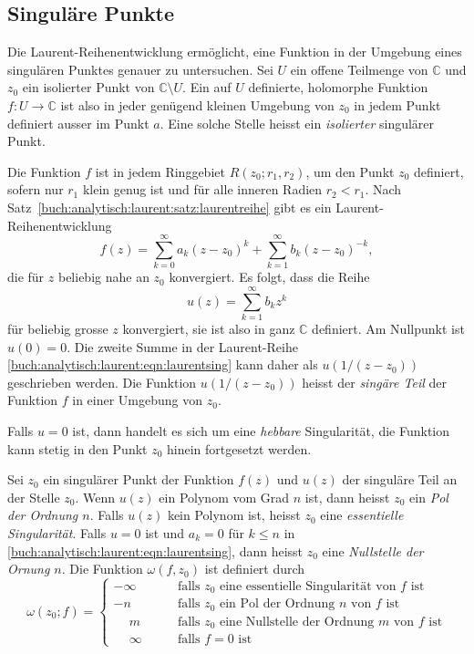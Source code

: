 %
%
%
\subsection{Singuläre Punkte}
Die Laurent-Reihenentwicklung ermöglicht, eine Funktion in der Umgebung
eines singulären Punktes genauer zu untersuchen.
Sei $U$ ein offene Teilmenge von $\mathbb{C}$ und $z_0$ ein isolierter
Punkt von $\mathbb{C}\setminus U$.
Ein auf $U$ definierte, holomorphe Funktion $f\colon U\to\mathbb{C}$
ist also in jeder genügend kleinen Umgebung von $z_0$ in jedem Punkt
definiert ausser im Punkt $a$.
Eine solche Stelle heisst ein \emph{isolierter} singulärer Punkt.
%
%

Die Funktion $f$ ist in jedem Ringgebiet $R(z_0;r_1,r_2)$, um den Punkt
$z_0$ definiert, sofern nur $r_1$ klein genug ist und für 
alle inneren Radien $r_2<r_1$.
Nach Satz~\ref{buch:analytisch:laurent:satz:laurentreihe} gibt es
ein Laurent-Reihenentwicklung
\begin{equation}
f(z)
=
\sum_{k=0}^\infty a_k(z-z_0)^k
+
\sum_{k=1}^\infty b_k(z-z_0)^{-k},
\label{buch:analytisch:laurent:eqn:laurentsing}
\end{equation}
die für $z$ beliebig nahe an $z_0$ konvergiert.
Es folgt, dass die Reihe
\[
u(z)
=
\sum_{k=1}^\infty b_kz^k
\]
für beliebig grosse $z$ konvergiert, sie ist also in ganz $\mathbb{C}$
definiert.
Am Nullpunkt ist $u(0)=0$.
Die zweite Summe in der Laurent-Reihe
\eqref{buch:analytisch:laurent:eqn:laurentsing}
kann daher als $u(1/(z-z_0))$ geschrieben werden.
Die Funktion $u(1/(z-z_0))$ heisst der \emph{singäre Teil} der Funktion $f$
in einer Umgebung von $z_0$.
%

Falls $u=0$ ist, dann handelt es sich um eine \emph{hebbare} Singularität,
die Funktion kann stetig in den Punkt $z_0$ hinein fortgesetzt werden.

\begin{definition}
Sei $z_0$ ein singulärer Punkt der Funktion $f(z)$ und $u(z)$ der 
singuläre Teil an der Stelle $z_0$.
Wenn $u(z)$ ein Polynom vom Grad $n$ ist, dann heisst $z_0$ ein
\emph{Pol der Ordnung $n$}.
%
%
Falls $u(z)$ kein Polynom ist, heisst $z_0$ eine \emph{essentielle
Singularität}.
%
Falls $u=0$ ist und $a_k=0$ für $k\le n$ in 
\eqref{buch:analytisch:laurent:eqn:laurentsing},
dann heisst $z_0$ eine \emph{Nullstelle der Ornung $n$}.
%
Die Funktion $\omega(f,z_0)$ ist definiert durch
\[
\omega(z_0;f)
=
\begin{cases}
-\infty&\qquad\text{falls $z_0$ eine essentielle Singularität von $f$ ist}\\
-n&\qquad\text{falls $z_0$ ein Pol der Ordnung $n$ von $f$ ist}\\
\phantom{-}m&\qquad\text{falls $z_0$ eine Nullstelle der Ordnung $m$ von $f$ ist}\\
\phantom{-}\infty&\qquad\text{falls $f=0$ ist}
\end{cases}
\]
\end{definition}

